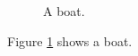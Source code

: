 \documentclass{article}
\begin{document}
\begin{figure}
  \caption{A boat.}
  \label{fig:boat1}
\end{figure}

Figure \ref{fig:boat1} shows a boat.
\end{document}
